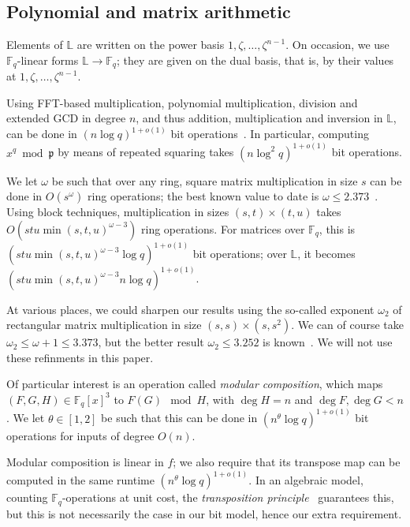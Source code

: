 \documentclass[sigconf]{acmart}
\newcommand{\F}{\mathbb{F}}
\renewcommand{\L}{\mathbb{L}}
\newcommand{\frakp}{\mathfrak{p}}
\begin{document}
\subsection{Polynomial and matrix arithmetic}\label{ssec:basicpoly}


\smallskip{}  Elements of $\L$ are written on 
the power basis $1,\zeta,\dots,\zeta^{n-1}$. On occasion, we use 
$\F_q$-linear forms $\L \to \F_q$; they are given on the dual 
basis, that is, by their values at $1,\zeta,\dots,\zeta^{n-1}$.

Using FFT-based multiplication,
polynomial multiplication, division and extended GCD in degree $n$,
and thus addition, multiplication and inversion in $\L$, can be done
in $(n\log q)^{1+o(1)}$ bit
operations~\cite{Gathen:2003:MCA:945759}. In particular, computing
$x^q \bmod \frakp$ by means of repeated squaring takes $(n\log^2
q)^{1+o(1)}$ bit operations.

\smallskip{}  We let $\omega$ be such that over any
ring, square matrix multiplication in size $s$ can be done in
$O(s^\omega)$ ring operations; the best known value to date is $\omega
\le 2.373$~\cite{CoWi90,LeGall14}. Using block techniques,
multiplication in sizes $(s,t) \times (t,u)$ takes $O(stu
\min(s,t,u)^{\omega-3})$ ring operations. For matrices over
$\F_q$, this is $(stu \min(s,t,u)^{\omega-3} \log q)^{1+o(1)}$ bit
operations; over $\L$, it becomes $(stu \min(s,t,u)^{\omega-3}
n\log q)^{1+o(1)}$.

At various places, we could sharpen our results using the so-called
exponent $\omega_2$ of rectangular matrix multiplication in size
$(s,s) \times (s,s^2)$. We can of course take $\omega_2\le\omega+1 \le
3.373$, but the better result $\omega_2 \le 3.252$ is
known~\cite{LeUr18}. We will not use these refinments in this paper.

\smallskip{} Of particular interest is an operation
called {\em modular composition}, which maps $(F,G,H) \in \F_q[x]^3$
to $F(G) \mod H$, with $\deg H=n$ and $\deg F,\deg G < n$.  We let
$\theta \in [1,2]$ be such that this can be done in $(n^\theta
\log q)^{1+o(1)}$ bit operations for inputs of degree $O(n)$.

Modular composition is linear in $f$; we also require that its
transpose map can be computed in the same runtime $(n^\theta
\log q)^{1+o(1)}$. In an algebraic model, counting $\F_q$-operations
at unit cost, the {\em transposition principle}~\cite{KaKiBs88}
guarantees this, but this is not necessarily the case in our bit
model, hence our extra requirement.
\end{document}
